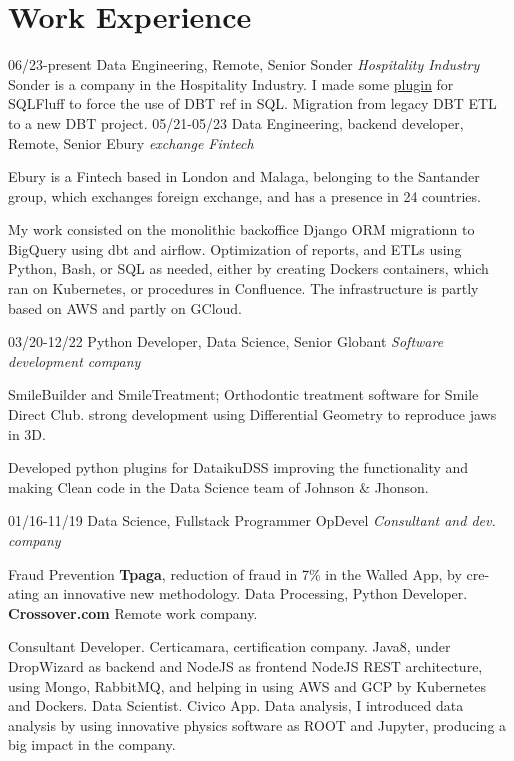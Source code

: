 \section{Work Experience}

\begin{entrylist}
  \entry
    {06/23-present}
    {Data Engineering, Remote, Senior}
    {Sonder {\sl Hospitality Industry}}
	{Sonder is a company in the Hospitality Industry. I made some \href{http:\\https://github.com/juanfejara/sqlfluff-templ-check}{plugin} for SQLFluff to
     force the use of DBT ref in SQL. Migration from legacy DBT ETL to a new DBT project.}
  \entry
    {05/21-05/23}
    {Data Engineering, backend developer, Remote, Senior}
    {Ebury {\sl exchange Fintech}}
    {Ebury is a Fintech based in London and Malaga, belonging to the Santander group, which exchanges
foreign exchange, and has a presence in 24 countries.

My work consisted on the monolithic backoffice Django ORM migrationn to BigQuery using dbt and airflow. Optimization of reports, and ETLs
using Python, Bash, or SQL as needed, either by creating Dockers containers, which ran on Kubernetes, or procedures in Confluence.
The infrastructure is partly based on AWS and partly on GCloud.}
  \entry
    {03/20-12/22}
    {Python Developer, Data Science, Senior}
    {Globant {\sl Software development company}}
    {SmileBuilder and SmileTreatment; Orthodontic treatment software for Smile Direct Club. strong development using Differential Geometry to reproduce jaws in 3D.

Developed python plugins for DataikuDSS improving the functionality and making
Clean code in the Data Science team of Johnson \& Jhonson.}

  \entry
    {01/16-11/19}
    {Data Science, Fullstack Programmer}
    {OpDevel {\sl Consultant and dev. company}}
    {Fraud Prevention \textbf{Tpaga}, reduction of fraud in 7\% in the Walled App, by cre-
ating an innovative new methodology. Data Processing, Python Developer. \textbf{Crossover.com} Remote work company.

Consultant Developer. Certicamara, certification company. Java8, under
DropWizard as backend and NodeJS as frontend NodeJS REST architecture,
using Mongo, RabbitMQ, and helping in using AWS and GCP by Kubernetes
and Dockers. Data Scientist. Civico App. Data analysis, I introduced data analysis by using
innovative physics software as ROOT and Jupyter, producing a big impact in
the company.

}
\end{entrylist}
